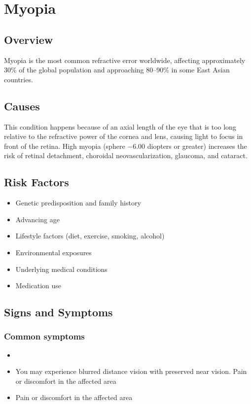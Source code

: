 \chapter{Myopia}
\label{sec:Myopia}

\section{Overview}
Myopia is the most common refractive error worldwide, affecting approximately 30\% of the global population and approaching 80--90\% in some East Asian countries.
\section{Causes}
This condition happens because of an axial length of the eye that is too long relative to the refractive power of the cornea and lens, causing light to focus in front of the retina. High myopia (sphere $-6.00$ diopters or greater) increases the risk of retinal detachment, choroidal neovascularization, glaucoma, and cataract.     
\section{Risk Factors}

\begin{itemize}[noitemsep]
  \item Genetic predisposition and family history
  \item Advancing age
  \item Lifestyle factors (diet, exercise, smoking, alcohol)
  \item Environmental exposures
  \item Underlying medical conditions
  \item Medication use
\end{itemize}
\section{Signs and Symptoms}

\subsection{Common symptoms}
\begin{itemize}[noitemsep]
  \item \item You may experience blurred distance vision with preserved near vision. Pain or discomfort in the affected area    \item Pain or discomfort in the affected area
  \end{itemize}

